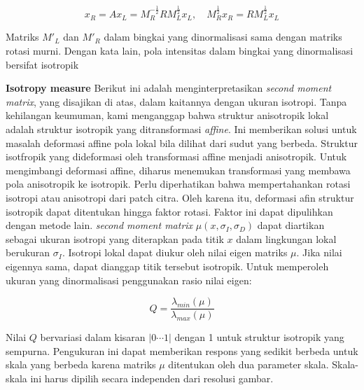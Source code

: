 \begin{equation}
  x_{R} = A x_{L} = M_{R}^{-\frac{1}{2}}R M_{L}^{\frac{1}{2}} x_{L}, \quad M_{R}^{\frac{1}{2}}x_{R} = R M_{L}^{\frac{1}{2}} x_{L}
\end{equation}

Matriks \(M'_{L}\) dan \(M'_{R}\) dalam bingkai yang dinormalisasi sama dengan matriks rotasi murni. Dengan kata lain, pola intensitas dalam bingkai yang dinormalisasi bersifat isotropik

\textbf{Isotropy measure} Berikut ini adalah menginterpretasikan \emph{second moment matrix}, yang disajikan 
di atas, dalam kaitannya dengan ukuran isotropi. Tanpa kehilangan keumuman, kami menganggap bahwa struktur 
anisotropik lokal adalah struktur isotropik yang ditransformasi \emph{affine}. Ini memberikan solusi untuk 
masalah deformasi affine pola lokal bila dilihat dari sudut yang berbeda. Struktur isotfropik yang 
dideformasi oleh transformasi affine menjadi anisotropik. Untuk mengimbangi deformasi affine, 
diharus menemukan transformasi yang membawa pola anisotropik ke isotropik. 
Perlu diperhatikan bahwa mempertahankan rotasi isotropi atau anisotropi dari patch citra.
Oleh karena itu, deformasi afin struktur isotropik dapat ditentukan hingga faktor rotasi. 
Faktor ini dapat dipulihkan dengan metode lain. \emph{second moment matrix} \(\mu(x,\sigma_{I},\sigma_{D})\)
dapat diartikan sebagai ukuran isotropi yang diterapkan pada titik \(x\) dalam lingkungan lokal berukuran \(\sigma_{I}\). 
Isotropi lokal dapat diukur oleh nilai eigen matriks \(\mu\). Jika nilai eigennya sama, dapat dianggap titik tersebut isotropik. 
Untuk memperoleh ukuran yang dinormalisasi penggunakan rasio nilai eigen:

\begin{equation}
  Q = \frac{\lambda_{min}(\mu)}{\lambda_{max}(\mu)}
\end{equation}

Nilai \(Q\) bervariasi dalam kisaran \(\left| 0 \cdots  1\right|\) dengan 1 untuk struktur isotropik yang sempurna. 
Pengukuran ini dapat memberikan respons yang sedikit berbeda untuk skala yang berbeda karena matriks \(\mu\) 
ditentukan oleh dua parameter skala. Skala-skala ini harus dipilih secara independen dari resolusi gambar.

